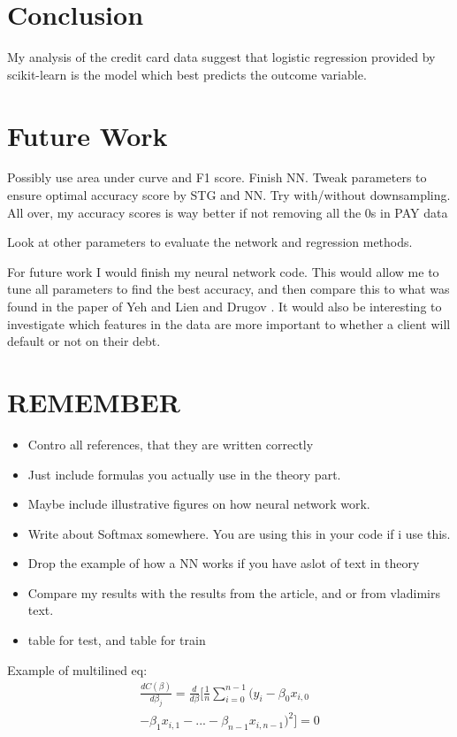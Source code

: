 \documentclass[a4paper,11pt,twocolumn]{article}
\begin{document}
\section{Conclusion}
My analysis of the credit card data suggest that logistic regression provided by scikit-learn is the model which best predicts the outcome variable.  

\section{Future Work}
Possibly use area under curve and F1 score. Finish NN. Tweak parameters to ensure optimal accuracy score by STG and NN. Try with/without downsampling. All over, my accuracy scores is way better if not removing all the 
0s in PAY data

Look at other parameters to evaluate the network and regression methods.

For future work I would finish my neural network code. This would allow me to tune all parameters to find the best accuracy, and then compare this to what was found in the paper of Yeh and Lien and Drugov \cite{vladimir}. It would also be interesting to investigate which features in the data are more important to whether a client will default or not on their debt.   

\section{REMEMBER}
\begin{itemize}
\item Contro all references, that they are written correctly 
\item Just include formulas you actually use in the theory part.
\item Maybe include illustrative figures on how neural network work.
\item Write about Softmax somewhere. You are using this in your code if i use this. 
\item Drop the example of how a NN works if you have aslot of text in theory
\item Compare my results with the results from the article, and or from vladimirs text.
\item table for test, and table for train
\end{itemize}

Example of multilined eq:
\begin{equation}
\begin{multlined}
\frac{dC(\beta)}{d\beta_j}= \frac{d}{d\beta}[\frac{1}{n}\sum\limits_{i=0}^{n-1}(y_i-\beta_0x_{i,0}\\-\beta_1x_{i,1}-...-\beta_{n-1}x_{i,n-1})^2] = 0
\end{multlined}
\end{equation}
\end{document}
